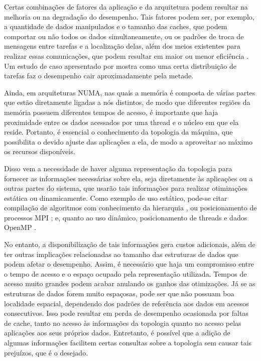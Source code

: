 Certas combinações de fatores da aplicação e da arquitetura podem resultar na melhoria ou na degradação do desempenho.
Tais fatores podem ser, por exemplo, a quantidade de dados manipulados e o tamanho das caches, que podem comportar ou não todos os dados simultaneamente, ou os padrões de troca de mensagens entre tarefas e a localização delas, além dos meios existentes para realizar essas comunicações, que podem resultar em maior ou menor eficiência \cite{Sequoia}. Um estudo de caso apresentado por  mostra como uma certa distribuição de tarefas faz o desempenho cair aproximadamente pela metade.

Ainda, em arquiteturas NUMA, nas quais a memória é composta de várias partes que estão diretamente ligadas a nós distintos, de modo que diferentes regiões da memória possuem diferentes tempos de acesso, é importante que haja proximidade entre os dados acessados por uma thread e o núcleo em que ela reside.
Portanto, é essencial o conhecimento da topologia da máquina, que possibilita o devido ajuste das aplicações a ela, de modo a aproveitar ao máximo os recursos disponíveis.

Disso vem a necessidade de haver alguma representação da topologia para fornecer as informações necessárias sobre ela, seja diretamente às aplicações ou a outras partes do sistema, que usarão tais informações para realizar otimizações estática ou dinamicamente.
Como exemplo de uso estático, pode-se citar compilação de algoritmos com conhecimento da hierarquia \cite{Sequoia}, ou posicionamento de processos MPI \cite{hwloc2010}; e, quanto ao uso dinâmico, posicionamento de threads e dados OpenMP \cite{FGOMP}.


No entanto, a disponibilização de tais informações gera custos adicionais, além de ter outras implicações relacionadas ao tamanho das estruturas de dados que podem afetar o desempenho.
Assim, é necessário que haja um compromisso entre o tempo de acesso e o espaço ocupado pela representação utilizada.
Tempos de acesso muito grandes podem acabar anulando os ganhos das otimizações.
Já se as estruturas de dados forem muito espaçosas, pode ser que não possuam boa localidade espacial, dependendo dos padrões de referência aos dados em acessos consecutivos.
Isso pode resultar em perda de desempenho ocasionada por faltas de cache, tanto no acesso às informações da topologia quanto no acesso pelas aplicações aos seus próprios dados.
Entretanto, é possível que a adição de algumas informações facilitem certas consultas sobre a topologia sem causar tais prejuízos, que é o desejado.



